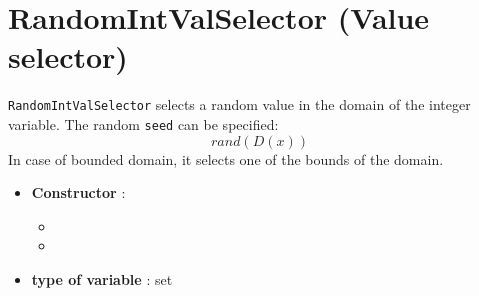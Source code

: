 \section{RandomIntValSelector (Value selector)}\label{randomintvalselector:randomintvalselectorvalselector}\hypertarget{randomintvalselector:randomintvalselectorvalselector}{}
\begin{notedef}
  \texttt{RandomIntValSelector} selects a random value in the domain of the integer variable. The random \texttt{seed} can be specified:
$$rand(D(x))$$
In case of bounded domain, it selects one of the bounds of the domain. 

\end{notedef}

\begin{itemize}
	\item \textbf{Constructor} : 
		\begin{itemize}
		\item {}
		\item {}
		\end{itemize}
	\item \textbf{type of variable} : set
\end{itemize}

%

